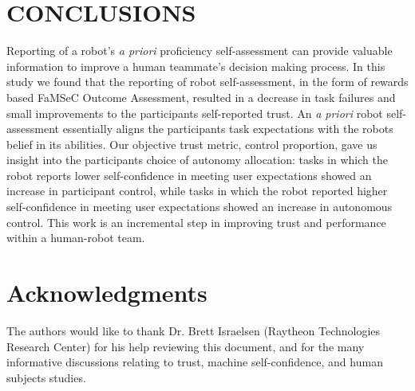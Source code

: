 \documentclass[aaai]{article}
\begin{document}
\addtolength{\textheight}{-9cm}%

\section{CONCLUSIONS}
Reporting of a robot's \textit{a priori} proficiency self-assessment can provide valuable information to improve a human teammate's decision making process. In this study we found that the reporting of robot self-assessment, in the form of rewards based FaMSeC Outcome Assessment, resulted in a decrease in task failures and small improvements to the participants self-reported trust. An \textit{a priori} robot self-assessment essentially aligns the participants task expectations with the robots belief in its abilities. Our objective trust metric, control proportion, gave us insight into the participants choice of autonomy allocation: tasks in which the robot reports lower self-confidence in meeting user expectations showed an increase in participant control, while tasks in which the robot reported higher self-confidence in meeting user expectations showed an increase in autonomous control. This work is an incremental step in improving trust and performance within a human-robot team.

\section{ Acknowledgments}
The authors would like to thank Dr. Brett Israelsen (Raytheon Technologies Research Center) for his help reviewing this document, and for the many informative discussions relating to trust, machine self-confidence, and human subjects studies.



\end{document}
